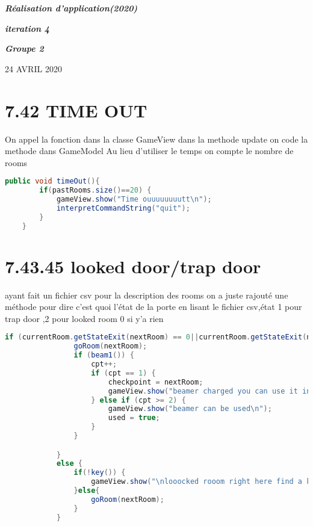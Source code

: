 \documentclass[a4paper , 10pt]{article}
\begin{document}
\begin{center}
\begin{huge}
\textit{\textbf{Réalisation d'application(2020)}}
\end{huge}
\end{center}
\begin{center}
\begin{LARGE}
\textit{\textbf{iteration 4}}
\end{LARGE}
\end{center}
\textit{}
\textit{}
\begin{center}
\begin{flushleft}
\begin{Large}
\textbf{\textit{Groupe 2}}
\end{Large}
\end{flushleft}
\end{center}
\begin{center}
24 AVRIL 2020
\end{center}
\section{7.42 TIME OUT}
On appel la fonction dans la classe GameView dans la methode update on code la methode dans GameModel Au lieu d’utiliser le temps on compte le nombre de rooms

\begin{lstlisting}[language=Java]
    public void timeOut(){
        if(pastRooms.size()==20) {
            gameView.show("Time ouuuuuuuutt\n");
            interpretCommandString("quit");
        }
    }
\end{lstlisting}

\section{7.43.45 looked door/trap door}
ayant fait un fichier csv pour la description  des rooms on a juste rajouté une méthode pour dire c'est quoi l'état de la porte en lisant le fichier csv,état 1 pour trap door ,2 pour looked room 0 si y'a rien

\begin{lstlisting}[language=Java]
            if (currentRoom.getStateExit(nextRoom) == 0||currentRoom.getStateExit(nextRoom) == 1 ) {
                goRoom(nextRoom);
                if (beam1()) {
                    cpt++;
                    if (cpt == 1) {
                        checkpoint = nextRoom;
                        gameView.show("beamer charged you can use it in the next room");
                    } else if (cpt >= 2) {
                        gameView.show("beamer can be used\n");
                        used = true;
                    }
                }

            }
            else {
                if(!key()) {
                    gameView.show("\nlooocked rooom right here find a key to open it\n");
                }else{
                    goRoom(nextRoom);
                }
            }
\end{lstlisting}
\end{document}
